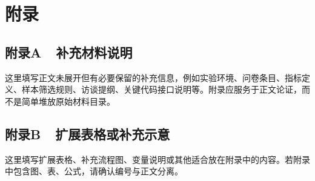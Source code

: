 
\chapter*{附\hspace{1em}录}

\newcommand{\setappendixnumbering}[1]{
  \setcounter{figure}{0}
  \setcounter{table}{0}
  \setcounter{equation}{0}
  \renewcommand{\thefigure}{#1\ifnum\value{figure}<10 0\fi\arabic{figure}}
  \renewcommand{\thetable}{#1-\arabic{table}}
  \renewcommand{\theequation}{#1-\arabic{equation}}
}

\section*{附录A~~补充材料说明}
\setappendixnumbering{A}

这里填写正文未展开但有必要保留的补充信息，例如实验环境、问卷条目、指标定义、样本筛选规则、访谈提纲、关键代码接口说明等。附录应服务于正文论证，而不是简单堆放原始材料目录。

\section*{附录B~~扩展表格或补充示意}
\setappendixnumbering{B}

这里填写扩展表格、补充流程图、变量说明或其他适合放在附录中的内容。若附录中包含图、表、公式，请确认编号与正文分离。
